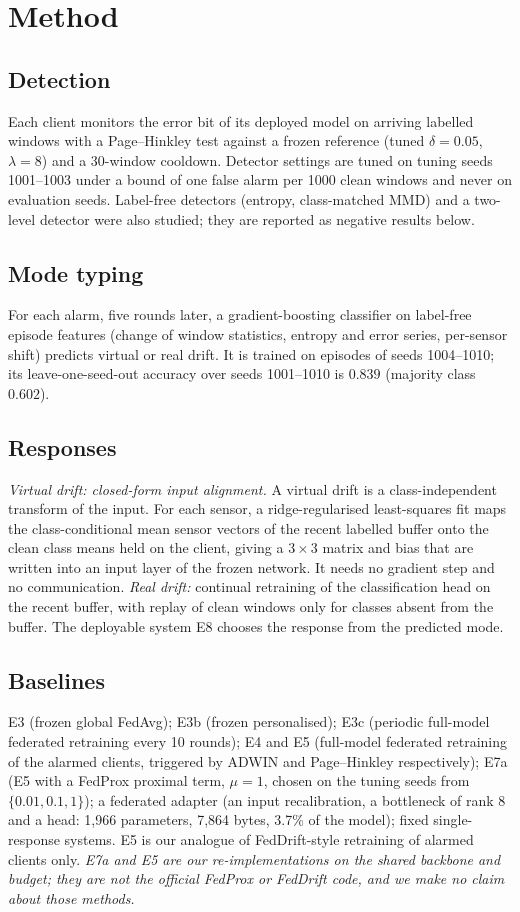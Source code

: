 \documentclass[journal]{IEEEtran}
\begin{document}
\section{Method}
\subsection{Detection}
Each client monitors the error bit of its deployed model on arriving labelled windows with a Page--Hinkley test against a frozen reference (tuned $\delta=0.05$, $\lambda=8$) and a 30-window cooldown. Detector settings are tuned on tuning seeds 1001--1003 under a bound of one false alarm per 1000 clean windows and never on evaluation seeds. Label-free detectors (entropy, class-matched MMD) and a two-level detector were also studied; they are reported as negative results below.

\subsection{Mode typing}
For each alarm, five rounds later, a gradient-boosting classifier on label-free episode features (change of window statistics, entropy and error series, per-sensor shift) predicts virtual or real drift. It is trained on episodes of seeds 1004--1010; its leave-one-seed-out accuracy over seeds 1001--1010 is $0.839$ (majority class $0.602$).

\subsection{Responses}
\emph{Virtual drift: closed-form input alignment.} A virtual drift is a class-independent transform of the input. For each sensor, a ridge-regularised least-squares fit maps the class-conditional mean sensor vectors of the recent labelled buffer onto the clean class means held on the client, giving a $3\times3$ matrix and bias that are written into an input layer of the frozen network. It needs no gradient step and no communication. \emph{Real drift:} continual retraining of the classification head on the recent buffer, with replay of clean windows only for classes absent from the buffer. The deployable system E8 chooses the response from the predicted mode.

\subsection{Baselines}
E3 (frozen global FedAvg); E3b (frozen personalised); E3c (periodic full-model federated retraining every 10 rounds); E4 and E5 (full-model federated retraining of the alarmed clients, triggered by ADWIN and Page--Hinkley respectively); E7a (E5 with a FedProx proximal term, $\mu=1$, chosen on the tuning seeds from $\{0.01,0.1,1\}$); a federated adapter (an input recalibration, a bottleneck of rank 8 and a head: 1{,}966 parameters, 7{,}864 bytes, 3.7\% of the model); fixed single-response systems. E5 is our analogue of FedDrift-style retraining of alarmed clients only. \emph{E7a and E5 are our re-implementations on the shared backbone and budget; they are not the official FedProx or FedDrift code, and we make no claim about those methods.}
\end{document}
